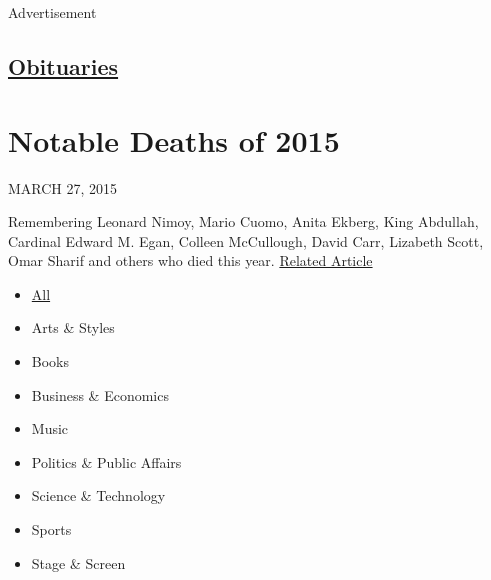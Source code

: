 Advertisement

\hypertarget{-obituaries-}{%
\subsection{\texorpdfstring{
\href{https://www.nytimes3xbfgragh.onion/section/obituaries}{Obituaries}
}{ Obituaries }}\label{-obituaries-}}

\hypertarget{notable-deaths-of-2015}{%
\section{Notable Deaths of 2015}\label{notable-deaths-of-2015}}

MARCH 27, 2015

Remembering Leonard Nimoy, Mario Cuomo, Anita Ekberg, King Abdullah,
Cardinal Edward M. Egan, Colleen McCullough, David Carr, Lizabeth Scott,
Omar Sharif and others who died this year.
\href{https://www.nytimes3xbfgragh.onion/interactive/2014/obituaries/notable-deaths-2014.html}{Related
Article}

\begin{itemize}
\tightlist
\item
  \href{/}{All}
\end{itemize}

\begin{itemize}
\tightlist
\item
  Arts \& Styles
\item
  Books
\item
  Business \& Economics
\item
  Music
\item
  Politics \& Public Affairs
\item
  Science \& Technology
\item
  Sports
\item
  Stage \& Screen
\end{itemize}

\subsection{}

